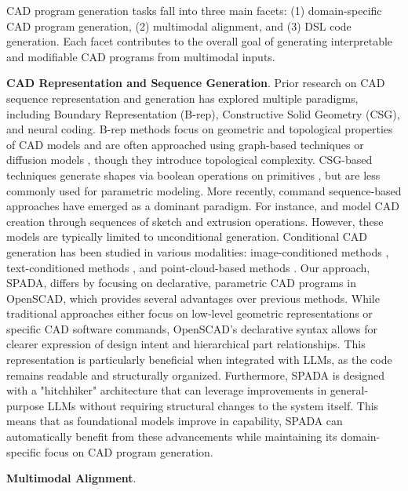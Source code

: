 \documentclass[letterpaper]{article} %
\begin{document}
CAD program generation tasks fall into three main facets: (1) domain-specific CAD program generation, (2) multimodal alignment, and (3) DSL code generation. Each facet contributes to the overall goal of generating interpretable and modifiable CAD programs from multimodal inputs.

\textbf{CAD Representation and Sequence Generation}. Prior research on CAD sequence representation and generation has explored multiple paradigms, including Boundary Representation (B-rep), Constructive Solid Geometry (CSG), and neural coding. B-rep methods focus on geometric and topological properties of CAD models and are often approached using graph-based techniques or diffusion models \citep{koch2019abc,guo2022complexgen}, though they introduce topological complexity. CSG-based techniques generate shapes via boolean operations on primitives \citep{ren2021csg}, but are less commonly used for parametric modeling. More recently, command sequence-based approaches have emerged as a dominant paradigm. For instance, \citet{wu2021deepcad} and \citet{willis2021fusion360} model CAD creation through sequences of sketch and extrusion operations. However, these models are typically limited to unconditional generation. Conditional CAD generation has been studied in various modalities: image-conditioned methods \citep{you2024img2cad,yuan2024openecad}, text-conditioned methods \citep{khan2024text2cad,badagabettu2024query2cad}, and point-cloud-based methods \citep{uy2022point2cyl,dupont2024transcad}. Our approach, SPADA, differs by focusing on declarative, parametric CAD programs in OpenSCAD, which provides several advantages over previous methods. While traditional approaches either focus on low-level geometric representations or specific CAD software commands, OpenSCAD's declarative syntax allows for clearer expression of design intent and hierarchical part relationships. This representation is particularly beneficial when integrated with LLMs, as the code remains readable and structurally organized. Furthermore, SPADA is designed with a "hitchhiker" architecture that can leverage improvements in general-purpose LLMs without requiring structural changes to the system itself. This means that as foundational models improve in capability, SPADA can automatically benefit from these advancements while maintaining its domain-specific focus on CAD program generation.

\textbf{Multimodal Alignment}.
\end{document}

